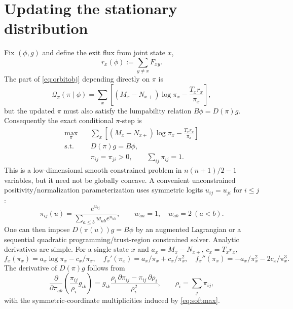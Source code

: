 \documentclass[10pt]{article}
\begin{document}
\section{Updating the stationary distribution}
Fix $(\phi,g)$ and define the exit flux from joint state $x$,
\begin{equation}
r_x(\phi):=\sum_{y\ne x}F_{xy}.
\end{equation}
The part of \eqref{eq:orbitobj} depending directly on $\pi$ is
\begin{equation}\label{eq:piobjfixedF}
\mathcal Q_\pi(\pi\mid\phi)=\sum_x\left[(M_x-N_{x+})\log\pi_x-\frac{T_xr_x}{\pi_x}\right],
\end{equation}
but the updated $\pi$ must also satisfy the lumpability relation $B\phi=D(\pi)g$.  Consequently the exact conditional $\pi$-step is
\begin{equation}\label{eq:pistep}
\begin{aligned}
\max_\pi\quad &\sum_x\left[(M_x-N_{x+})\log\pi_x-\frac{T_xr_x}{\pi_x}\right]\\
\text{s.t.}\quad &D(\pi)g=B\phi,\\
&\pi_{ij}=\pi_{ji}>0,
\qquad \sum_{ij}\pi_{ij}=1.
\end{aligned}
\end{equation}
This is a low-dimensional smooth constrained problem in $n(n+1)/2-1$ variables, but it need not be globally concave.  A convenient unconstrained positivity/normalization parameterization uses symmetric logits $u_{ij}=u_{ji}$ for $i\le j$:
\begin{equation}\label{eq:softmax}
\pi_{ij}(u)=\frac{e^{u_{ij}}}{\sum_{a\le b}w_{ab}e^{u_{ab}}},
\qquad w_{aa}=1,
\quad w_{ab}=2\ (a<b).
\end{equation}
One can then impose $D(\pi(u))g=B\phi$ by an augmented Lagrangian or a sequential quadratic programming/trust-region constrained solver.  Analytic derivatives are simple.  For a single state $x$ and $a_x=M_x-N_{x+}$, $c_x=T_xr_x$,
\begin{equation}
f_x(\pi_x)=a_x\log\pi_x-c_x/\pi_x,
\quad
f_x'(\pi_x)=a_x/\pi_x+c_x/\pi_x^2,
\quad
f_x''(\pi_x)=-a_x/\pi_x^2-2c_x/\pi_x^3.
\end{equation}
The derivative of $D(\pi)g$ follows from
\begin{equation}
\frac{\partial}{\partial\pi_{ab}}\left(\frac{\pi_{ij}}{\rho_i}g_{ik}\right)
=g_{ik}\frac{\rho_i\,\partial\pi_{ij}-\pi_{ij}\,\partial\rho_i}{\rho_i^2},
\qquad \rho_i=\sum_j\pi_{ij},
\end{equation}
with the symmetric-coordinate multiplicities induced by \eqref{eq:softmax}.
\end{document}
